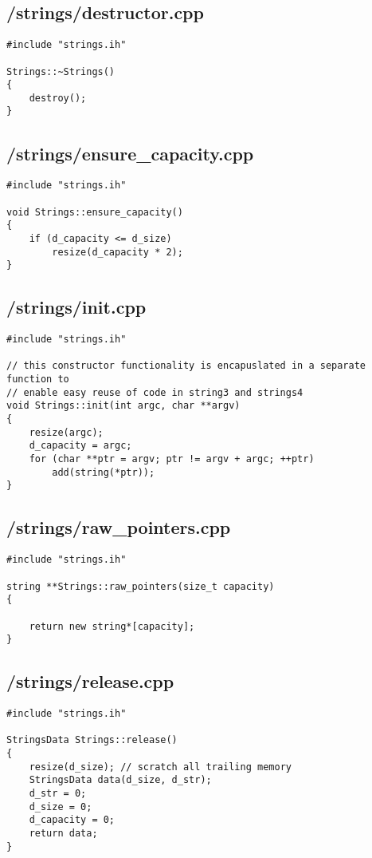 \documentclass{article}
\begin{document}
\subsection*{/strings/destructor.cpp}
\begin{verbatim}
#include "strings.ih"

Strings::~Strings()
{
    destroy();
}
\end{verbatim}
\subsection*{/strings/ensure\_capacity.cpp}
\begin{verbatim}
#include "strings.ih"

void Strings::ensure_capacity()
{
    if (d_capacity <= d_size)
        resize(d_capacity * 2);
}
\end{verbatim}
\subsection*{/strings/init.cpp}
\begin{verbatim}
#include "strings.ih"

// this constructor functionality is encapuslated in a separate function to
// enable easy reuse of code in string3 and strings4
void Strings::init(int argc, char **argv)
{
    resize(argc);
    d_capacity = argc;
    for (char **ptr = argv; ptr != argv + argc; ++ptr)
        add(string(*ptr));
}
\end{verbatim}
\subsection*{/strings/raw\_pointers.cpp}
\begin{verbatim}
#include "strings.ih"

string **Strings::raw_pointers(size_t capacity)
{

    return new string*[capacity];
}
\end{verbatim}
\subsection*{/strings/release.cpp}
\begin{verbatim}
#include "strings.ih"

StringsData Strings::release()
{
    resize(d_size); // scratch all trailing memory
    StringsData data(d_size, d_str);
    d_str = 0;
    d_size = 0;
    d_capacity = 0;
    return data;
}
\end{verbatim}
\end{document}
